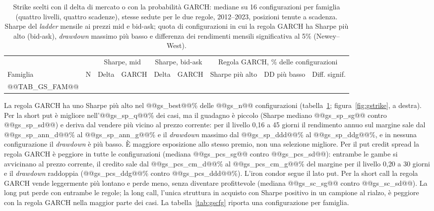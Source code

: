 \documentclass[11pt,a4paper]{article}
\begin{document}
\begin{table}[ht]\centering\footnotesize
\caption{Strike scelti con il delta di mercato o con la probabilità GARCH: mediane su 16 configurazioni per famiglia (quattro livelli, quattro scadenze), stesse sedute per le due regole, 2012--2023, posizioni tenute a scadenza. Sharpe del \emph{ladder} mensile ai prezzi mid e bid-ask; quota di configurazioni in cui la regola GARCH ha Sharpe più alto (bid-ask), \emph{drawdown} massimo più basso e differenza dei rendimenti mensili significativa al 5\% (Newey--West).}\label{tab:gsfam}
\begin{tabular}{lrrrrrrrr}\toprule
 & & \multicolumn{2}{c}{Sharpe, mid} & \multicolumn{2}{c}{Sharpe, bid-ask} & \multicolumn{3}{c}{Regola GARCH, \% delle configurazioni} \\ \cmidrule(lr){3-4}\cmidrule(lr){5-6}\cmidrule(lr){7-9}
Famiglia & N & Delta & GARCH & Delta & GARCH & Sharpe più alto & DD più basso & Diff. signif. \\ \midrule
@@TAB_GS_FAM@@
\bottomrule\end{tabular}\end{table}

La regola GARCH ha uno Sharpe più alto nel @@gs_best@@\% delle @@gs_n@@ configurazioni (tabella~\ref{tab:gsfam}; figura~\ref{fig:gstrike}, a destra). Per la short put è migliore nell'@@gs_sp_q@@\% dei casi, ma il guadagno è piccolo (Sharpe mediano @@gs_sp_sg@@ contro @@gs_sp_sd@@) e deriva dal vendere più vicino al prezzo corrente: per il livello 0{,}16 a 45 giorni il rendimento annuo sul margine sale dal @@gs_sp_ann_d@@\% al @@gs_sp_ann_g@@\% e il \emph{drawdown} massimo dal @@gs_sp_ddd@@\% al @@gs_sp_ddg@@\%, e in nessuna configurazione il \emph{drawdown} è più basso. È maggiore esposizione allo stesso premio, non una selezione migliore. Per il put credit spread la regola GARCH è peggiore in tutte le configurazioni (mediana @@gs_pcs_sg@@ contro @@gs_pcs_sd@@): entrambe le gambe si avvicinano al prezzo corrente, il credito sale dal @@gs_pcs_cm_d@@\% al @@gs_pcs_cm_g@@\% del margine per il livello 0{,}20 a 30 giorni e il \emph{drawdown} raddoppia (@@gs_pcs_ddg@@\% contro @@gs_pcs_ddd@@\%). L'iron condor segue il lato put. Per la short call la regola GARCH vende leggermente più lontano e perde meno, senza diventare profittevole (mediana @@gs_sc_sg@@ contro @@gs_sc_sd@@). La long put perde con entrambe le regole; la long call, l'unica struttura in acquisto con Sharpe positivo in un campione al rialzo, è peggiore con la regola GARCH nella maggior parte dei casi. La tabella~\ref{tab:gscfg} riporta una configurazione per famiglia.
\end{document}
